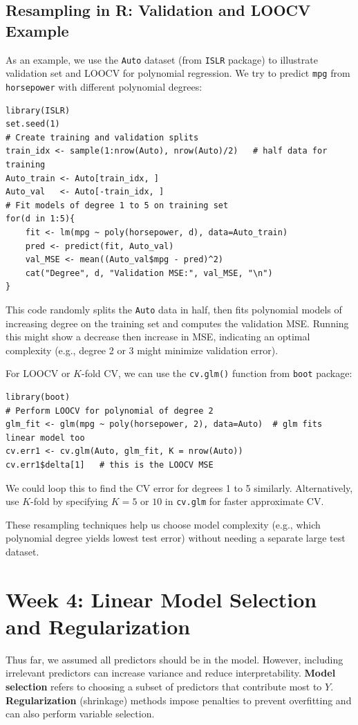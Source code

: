 \documentclass[11pt]{article}
\begin{document}
\subsection{Resampling in R: Validation and LOOCV Example}
As an example, we use the \texttt{Auto} dataset (from \texttt{ISLR} package) to illustrate validation set and LOOCV for polynomial regression. We try to predict \texttt{mpg} from \texttt{horsepower} with different polynomial degrees:
\begin{verbatim}
library(ISLR)
set.seed(1)
# Create training and validation splits
train_idx <- sample(1:nrow(Auto), nrow(Auto)/2)   # half data for training
Auto_train <- Auto[train_idx, ]
Auto_val   <- Auto[-train_idx, ]
# Fit models of degree 1 to 5 on training set
for(d in 1:5){
    fit <- lm(mpg ~ poly(horsepower, d), data=Auto_train)
    pred <- predict(fit, Auto_val)
    val_MSE <- mean((Auto_val$mpg - pred)^2)
    cat("Degree", d, "Validation MSE:", val_MSE, "\n")
}
\end{verbatim}
This code randomly splits the \texttt{Auto} data in half, then fits polynomial models of increasing degree on the training set and computes the validation MSE. Running this might show a decrease then increase in MSE, indicating an optimal complexity (e.g., degree 2 or 3 might minimize validation error).

For LOOCV or $K$-fold CV, we can use the \texttt{cv.glm()} function from \texttt{boot} package:
\begin{verbatim}
library(boot)
# Perform LOOCV for polynomial of degree 2
glm_fit <- glm(mpg ~ poly(horsepower, 2), data=Auto)  # glm fits linear model too
cv.err1 <- cv.glm(Auto, glm_fit, K = nrow(Auto))
cv.err1$delta[1]   # this is the LOOCV MSE
\end{verbatim}
We could loop this to find the CV error for degrees 1 to 5 similarly. Alternatively, use $K$-fold by specifying $K=5$ or $10$ in \texttt{cv.glm} for faster approximate CV.

These resampling techniques help us choose model complexity (e.g., which polynomial degree yields lowest test error) without needing a separate large test dataset.

\section{Week 4: Linear Model Selection and Regularization}
Thus far, we assumed all predictors should be in the model. However, including irrelevant predictors can increase variance and reduce interpretability. \textbf{Model selection} refers to choosing a subset of predictors that contribute most to $Y$. \textbf{Regularization} (shrinkage) methods impose penalties to prevent overfitting and can also perform variable selection.
\end{document}
